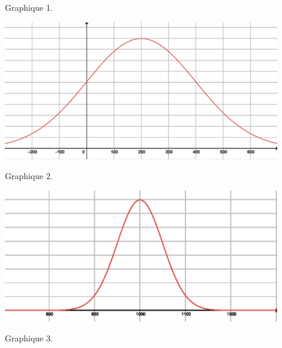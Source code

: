 \begin{enumerate}
\begin{center}
\end{center}
     \begin{center}
          Graphique 1.
     \end{center}
     \par
     \begin{center}
          \begin{extern}%
               \includegraphics[width=0.9\textwidth]{images/BBESL-s5-1-2}%
          \end{extern}
     \end{center}
     \begin{center}
          Graphique 2.
     \end{center}
     \begin{center}
          \begin{extern}%
               \includegraphics[width=0.9\textwidth]{images/BBESL-s5-1-3}%
          \end{extern}
     \end{center}
     \begin{center}
          Graphique 3.
     \end{center}
     \par

\end{enumerate}
